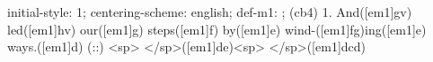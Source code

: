 initial-style: 1;
centering-scheme: english;
def-m1: \grealign;
(cb4) 1. And([em1]gv) led([em1]hv) our([em1]g) steps([em1]f) by([em1]e) wind-([em1]fg)ing([em1]e) ways.([em1]d) (::) <sp> </sp>([em1]de)<sp> </sp>([em1]dcd)